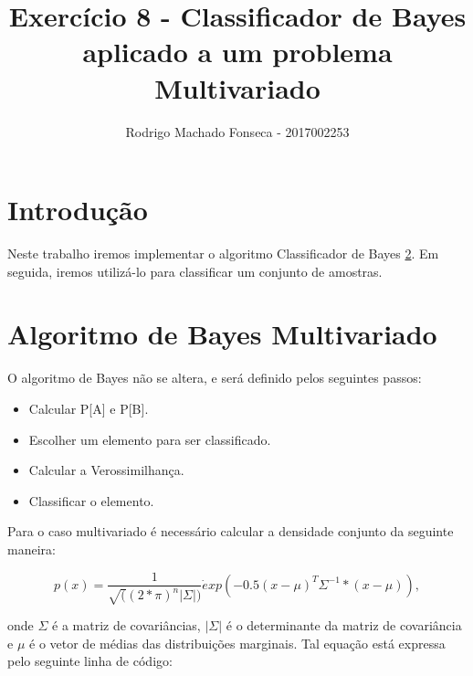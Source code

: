 \documentclass[12pt]{article}
\begin{document}

\pagestyle{fancy}
\fancyhf{}
\renewcommand{\headrulewidth}{0.4pt}
\fancyfoot[C]{\thepage}
\renewcommand{\footrulewidth}{0.4pt}
\fancyfoot[C]{\thepage}
\title{\LARGE \bf
 Exercício 8  - Classificador de Bayes aplicado a um problema
Multivariado }
\author{ Rodrigo Machado Fonseca - 2017002253}
\thispagestyle{fancy}
\maketitle
\thispagestyle{fancy}

\section{Introdução}

  \par Neste trabalho iremos implementar o algoritmo Classificador de Bayes \ref{ClassificadorBayes}. Em seguida, iremos utilizá-lo para classificar um conjunto de amostras.

\section{Algoritmo de Bayes Multivariado}
  \label{ClassificadorBayes}
  \par O algoritmo de Bayes não se altera, e será definido pelos seguintes passos:
  
   \begin{itemize}
  \item Calcular P[A] e P[B].
  \item Escolher um elemento para ser classificado. 
  \item Calcular a Verossimilhança. 
  \item Classificar o elemento.
  \end{itemize}

  \par Para o caso multivariado é necessário calcular a densidade conjunto da seguinte maneira:
  
  \begin{equation}
  p(x) = \frac{1}{\sqrt((2*\pi)^n|\Sigma|)}\dot exp(-0.5(x-\mu)^T\Sigma^{-1}*(x-\mu)), 
  \end{equation}
  
  \par onde $\Sigma$ é a matriz de covariâncias, $|\Sigma|$ é o determinante da matriz de covariância e $\mu$ é o vetor de médias das distribuições marginais. Tal equação está expressa pelo seguinte linha de código:
\end{document}
